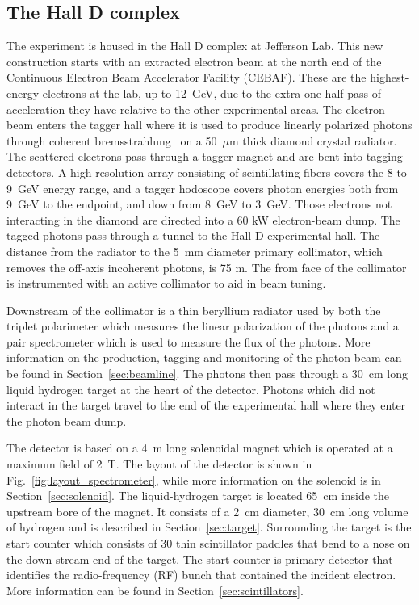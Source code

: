\subsection[The Hall D complex]{The Hall D complex \label{sec:gluexexperiment:complex}}
The \gx{} experiment is housed in the Hall D complex at Jefferson Lab. This new construction starts with an extracted electron beam at the north end of the Continuous Electron Beam Accelerator Facility (CEBAF). These are the highest-energy electrons at the lab, up to 12~GeV, due to the extra one-half pass of acceleration they have relative to the other experimental areas. The electron beam enters the tagger hall where it is used to produce linearly polarized photons through coherent bremsstrahlung~\cite{} on a 50~$\mu$m thick diamond crystal radiator. The scattered electrons pass through a tagger magnet and are bent into tagging detectors. A high-resolution array consisting of scintillating fibers covers the 8 to 9~GeV energy range, and a tagger hodoscope covers photon energies both from 9~GeV to the endpoint, and down from 8~GeV to 3~GeV. Those electrons not interacting in the diamond are directed into a 60 kW electron-beam dump. The tagged photons pass through a tunnel to the Hall-D experimental hall. The distance from the radiator to the 5~mm diameter primary collimator, which removes the off-axis incoherent photons, is 75 m. The from face of the collimator is instrumented with an active collimator to aid in beam tuning. 

Downstream of the collimator is a thin beryllium radiator used by both the triplet polarimeter which measures the linear polarization of the photons and a pair spectrometer which is used to measure the flux of the photons. More information on the production, tagging and monitoring of the photon beam can be found in Section~\ref{sec:beamline}. The photons then pass through a 30~cm long liquid hydrogen target at the heart of the \gx{} detector. Photons which did not interact in the target travel to the end of the experimental hall where they enter the photon beam dump.

The \gx{} detector is based on a 4~m long solenoidal magnet which is operated at a maximum field of 2~T. The layout of the detector is shown in Fig.~\ref{fig:layout_spectrometer}, while more information on the solenoid is in Section~\ref{sec:solenoid}. The liquid-hydrogen target is located 65~cm inside the upstream bore of the magnet. It consists of a 2~cm diameter, 30~cm long volume of hydrogen and is described in Section~\ref{sec:target}. Surrounding the target is the start counter which consists of 30 thin scintillator paddles that bend to a nose on the down-stream end of the target. The start counter is primary detector that identifies the radio-frequency (RF) bunch that contained the incident electron. More information can be found in Section~\ref{sec:scintillators}. 

